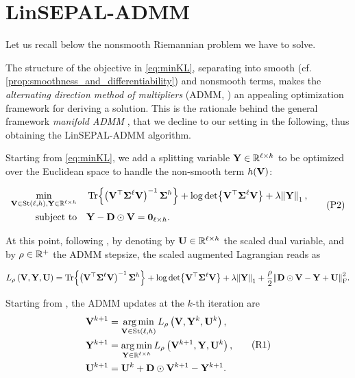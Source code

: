 \section{LinSEPAL-ADMM}\label{app:MADMM}
Let us recall below the nonsmooth Riemannian problem we have to solve.
\nonsmoothprob*

The structure of the objective in \eqref{eq:minKL}, separating into smooth (cf. \cref{prop:smoothness_and_differentiability}) and nonsmooth terms, makes the \emph{alternating direction method of multipliers} (ADMM, ) an appealing optimization framework for deriving a solution.
This is the rationale behind the general framework \emph{manifold ADMM} , that we decline to our setting in the following, thus obtaining the LinSEPAL-ADMM algorithm.

Starting from \eqref{eq:minKL}, we add a splitting variable $\mathbf{Y} \in \mathbb{R}^{\ell \times h}$ to be optimized over the Euclidean space to handle the non-smooth term $h(\mathbf{V})$:

\begin{equation}\label{eq:MADMM}
    \begin{aligned}
        \min_{\V \in \stiefel{\ell}{h}, \Y \in \rmatdim} & \quad \Tr{\left( \V^\top \covlow \V\right)^{-1} \covhigh} + \log\det{\V^\top \covlow \V} + \lambda \norm{\Y}_1 \, , \\
        \textrm{subject to} & \quad \Y - \D \odot \V=\zeros_{\ell \times h}.
    \end{aligned}
    \tag{P2}
\end{equation}

At this point, following , by denoting by $\mathbf{U} \in \mathbb{R}^{\ell \times h}$ the scaled dual variable, and by $\rho \in \mathbb{R}^+$ the ADMM stepsize, the scaled augmented Lagrangian reads as

\begin{equation}\label{eq:MADMMsAUL}
    L_{\rho}\left(\V, \Y, \scaledU \right) =  \Tr{\left( \V^\top \covlow \V\right)^{-1} \covhigh} + \log\det{\V^\top \covlow \V} + \lambda \norm{\Y}_1 + \frac{\rho}{2}\frob{\D\odot \V  - \Y + \scaledU}^2.
\end{equation}

Starting from , the ADMM updates at the $k$-th iteration are
\begin{equation}\label{eq:MADMMrecursion_app}
    \begin{aligned}
        \mathbf{V}^{k+1} &= \operatorname*{arg\,min}_{\mathbf{V} \in \mathrm{St}({\ell},{h})} L_{\rho}\left(\mathbf{V}, \mathbf{Y}^k, \mathbf{U}^k \right),\\
        \mathbf{Y}^{k+1} &= \operatorname*{arg\,min}_{\mathbf{Y} \in \mathbb{R}^{\ell \times h}} L_{\rho}\left(\mathbf{V}^{k+1}, \mathbf{Y}, \mathbf{U}^k \right),\\
        \mathbf{U}^{k+1} &= \mathbf{U}^k + \mathbf{D} \odot \mathbf{V}^{k+1} - \mathbf{Y}^{k+1}. 
    \end{aligned}
    \tag{R1}
\end{equation}


